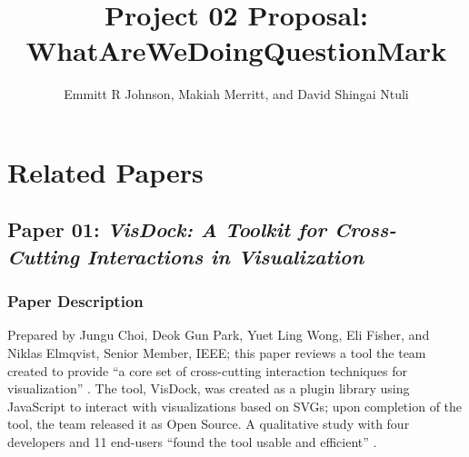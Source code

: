 \documentclass[journal]{vgtc}                %
\title{Project 02 Proposal: WhatAreWeDoingQuestionMark}
\author{Emmitt R Johnson, Makiah Merritt, and David Shingai Ntuli}
\begin{document}


\maketitle



\section{Related Papers}
    \subsection{Paper 01: \textit{VisDock: A Toolkit for Cross-Cutting Interactions in Visualization} \cite{VisDock:2014}}
        \subsubsection{Paper Description}
        Prepared by Jungu Choi, Deok Gun Park, Yuet Ling Wong, Eli Fisher, and Niklas Elmqvist, Senior Member, IEEE; this paper reviews a tool the team created to provide ``a core set of cross-cutting interaction techniques for visualization'' \cite[p.~1]{VisDock:2014}.
        The tool, VisDock, was created as a plugin library using JavaScript to interact with visualizations based on SVGs; upon completion of the tool, the team released it as Open Source.
        A qualitative study with four developers and 11 end-users ``found the tool usable and efficient'' \cite[p.~2]{VisDock:2014}.
\end{document}
